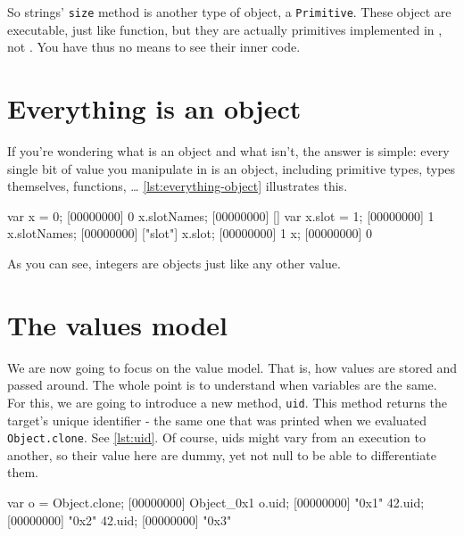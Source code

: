 \documentclass[openright,twoside,12pt]{report}
\begin{document}
So strings' \texttt{size} method is another type of object, a
\texttt{Primitive}. These object are executable, just like function,
but they are actually primitives implemented in \Cxx, not \urbi. You
have thus no means to see their inner code.

\section{Everything is an object}

If you're wondering what is an object and what isn't, the answer is
simple: every single bit of value you manipulate in \urbi is an
object, including primitive types, types themselves, functions, \ldots
\autoref{lst:everything-object} illustrates this.

\begin{urbiscript}[caption=Everything is an object,
label=lst:everything-object]
var x = 0;
[00000000] 0
x.slotNames;
[00000000] []
var x.slot = 1;
[00000000] 1
x.slotNames;
[00000000] ["slot"]
x.slot;
[00000000] 1
x;
[00000000] 0
\end{urbiscript}

As you can see, integers are objects just like any other value.

\section{The \urbi values model}

We are now going to focus on the \urbi value model. That is, how
values are stored and passed around. The whole point is to understand
when variables are the same. For this, we are going to introduce a new
method, \texttt{uid}. This method returns the target's unique
identifier - the same one that was printed when we evaluated
\lstinline|Object.clone|. See \autoref{lst:uid}. Of course, uids might vary
from an execution to another, so their value here are dummy, yet not
null to be able to differentiate them.

\begin{urbiscript}[caption=Uids, label=lst:uid]
var o = Object.clone;
[00000000] Object_0x1
o.uid;
[00000000] "0x1"
42.uid;
[00000000] "0x2"
42.uid;
[00000000] "0x3"
\end{urbiscript}
\end{document}
